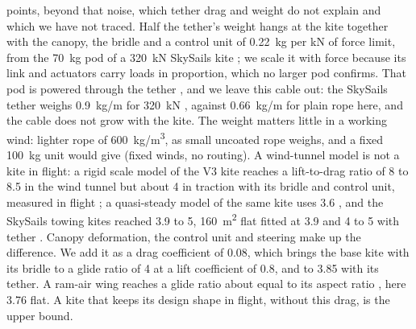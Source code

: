 points, beyond that noise, which tether drag and weight do not explain and which we have not traced. Half the tether's weight hangs at the kite together with the canopy, the bridle and a control unit of \SI{0.22}{kg} per kN of force limit, from the \SI{70}{kg} pod of a \SI{320}{kN} SkySails kite \citep{paulig2013}; we scale it with force because its link and actuators carry loads in proportion, which no larger pod confirms. That pod is powered through the tether \citep{maass2013}, and we leave this cable out: the SkySails tether weighs \SI{0.9}{kg/m} for \SI{320}{kN} \citep{paulig2013}, against \SI{0.66}{kg/m} for plain rope here, and the cable does not grow with the kite. The weight matters little in a working wind: lighter rope of \SI{600}{kg/m^3}, as small uncoated rope weighs, and a fixed \SI{100}{kg} unit would give  (fixed winds, no routing). A wind-tunnel model is not a kite in flight: a rigid scale model of the V3 kite reaches a lift-to-drag ratio of 8 to 8.5 in the wind tunnel \citep{poland2025} but about 4 in traction with its bridle and control unit, measured in flight \citep{oehler2019}; a quasi-steady model of the same kite uses 3.6 \citep{vandervlugt2019}, and the SkySails towing kites reached 3.9 to 5, \SI{160}{m^2} flat fitted at 3.9 and 4 to 5 with tether \citep{erhard2013b,paulig2013}. Canopy deformation, the control unit and steering make up the difference. We add it as a drag coefficient of 0.08, which brings the base kite with its bridle to a glide ratio of 4 at a lift coefficient of 0.8, and to 3.85 with its tether. A ram-air wing reaches a glide ratio about equal to its aspect ratio \citep{dunker2013}, here 3.76 flat. A kite that keeps its design shape in flight, without this drag, is the upper bound.

